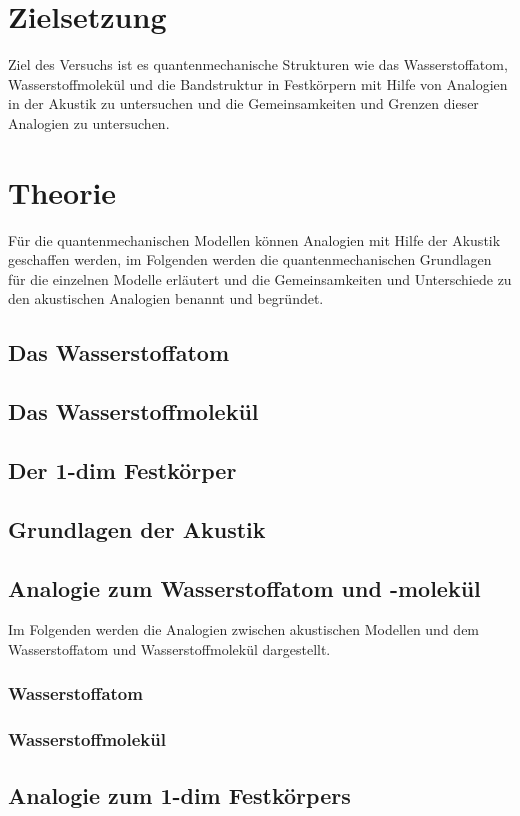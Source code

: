 \section{Zielsetzung}
\label{sec:ziel}

Ziel des Versuchs ist es quantenmechanische Strukturen wie das Wasserstoffatom, Wasserstoffmolekül und die Bandstruktur in Festkörpern mit Hilfe von Analogien in der Akustik zu untersuchen und die Gemeinsamkeiten und Grenzen dieser Analogien zu untersuchen. 

\section{Theorie}
\label{sec:theorie}

Für die quantenmechanischen Modellen können Analogien mit Hilfe der Akustik geschaffen werden, im Folgenden werden die quantenmechanischen Grundlagen für die einzelnen Modelle erläutert und die Gemeinsamkeiten und Unterschiede zu den akustischen Analogien benannt und begründet. 

\subsection{Das Wasserstoffatom}
\label{sec:H}



\subsection{Das Wasserstoffmolekül}
\label{sec:H2}



\subsection{Der 1-dim Festkörper}
\label{sec:festkoerper}



\subsection{Grundlagen der Akustik}
\label{sec:akustik}



\subsection{Analogie zum Wasserstoffatom und -molekül}
\label{sec:analogien}

Im Folgenden werden die Analogien zwischen akustischen Modellen und dem Wasserstoffatom und Wasserstoffmolekül dargestellt.

\subsubsection{Wasserstoffatom}
\label{sec:ana-H}



\subsubsection{Wasserstoffmolekül}
\label{sec:ana-H2}



\subsection{Analogie zum 1-dim Festkörpers}
\label{ana-fest}

